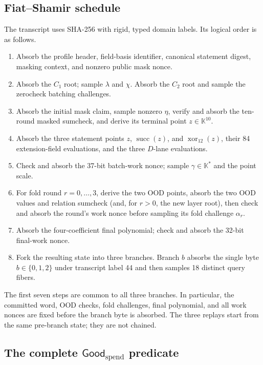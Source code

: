 \subsection{Fiat--Shamir schedule}

The transcript uses SHA-256 with rigid, typed domain labels.  Its logical
order is as follows.
\begin{enumerate}
  \item Absorb the profile header, field-basis identifier, canonical statement
        digest, masking context, and nonzero public mask nonce.
  \item Absorb the \(C_1\) root; sample \(\lambda\) and \(\chi\).  Absorb the
        \(C_2\) root and sample the zerocheck batching challenges.
  \item Absorb the initial mask claim, sample nonzero \(\eta\), verify and
        absorb the ten-round masked sumcheck, and derive its terminal point
        \(z\in\mathbb K^{10}\).
  \item Absorb the three statement points \(z\), \(\operatorname{succ}(z)\),
        and \(\operatorname{xor}_{12}(z)\), their 84 extension-field
        evaluations, and the three \(D\)-lane evaluations.
  \item Check and absorb the 37-bit batch-work nonce; sample
        \(\gamma\in\mathbb K^*\) and the point scale.
  \item For fold round \(r=0,\ldots,3\), derive the two OOD points, absorb
        the two OOD values and relation sumcheck (and, for \(r>0\), the new
        layer root), then check and absorb the round's work nonce before
        sampling its fold challenge \(\alpha_r\).
  \item Absorb the four-coefficient final polynomial; check and absorb the
        32-bit final-work nonce.
  \item Fork the resulting state into three branches.  Branch \(b\) absorbs
        the single byte \(b\in\{0,1,2\}\) under transcript label 44 and then
        samples 18 distinct query fibers.
\end{enumerate}
The first seven steps are common to all three branches.  In particular, the
committed word, OOD checks, fold challenges, final polynomial, and all work
nonces are fixed before the branch byte is absorbed.  The three replays start
from the same pre-branch state; they are not chained.

\subsection{The complete \texorpdfstring{\(\mathsf{Good}_{\mathrm{spend}}\)}{GoodSpend} predicate}

